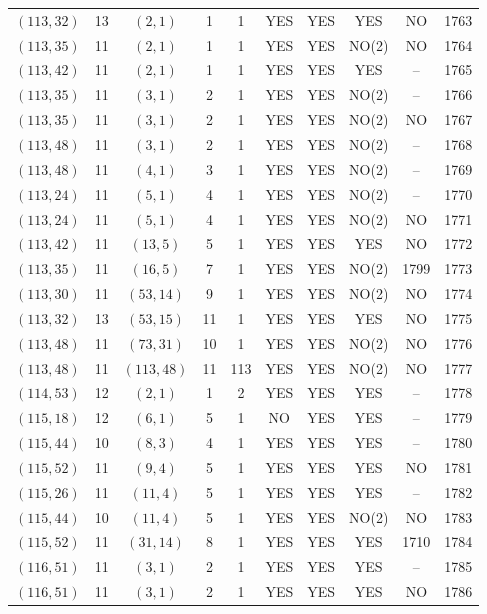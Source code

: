 \begin{longtable}{|c|c|c|c|c|c|c|c|c|c|}
$(113, 32)$ & 13 & $(2, 1)$ & 1 & 1 & YES & YES & YES & NO & 1763\\
$(113, 35)$ & 11 & $(2, 1)$ & 1 & 1 & YES & YES & NO(2) & NO & 1764\\
$(113, 42)$ & 11 & $(2, 1)$ & 1 & 1 & YES & YES & YES & -- & 1765\\
$(113, 35)$ & 11 & $(3, 1)$ & 2 & 1 & YES & YES & NO(2) & -- & 1766\\
$(113, 35)$ & 11 & $(3, 1)$ & 2 & 1 & YES & YES & NO(2) & NO & 1767\\
$(113, 48)$ & 11 & $(3, 1)$ & 2 & 1 & YES & YES & NO(2) & -- & 1768\\
$(113, 48)$ & 11 & $(4, 1)$ & 3 & 1 & YES & YES & NO(2) & -- & 1769\\
$(113, 24)$ & 11 & $(5, 1)$ & 4 & 1 & YES & YES & NO(2) & -- & 1770\\
$(113, 24)$ & 11 & $(5, 1)$ & 4 & 1 & YES & YES & NO(2) & NO & 1771\\
$(113, 42)$ & 11 & $(13, 5)$ & 5 & 1 & YES & YES & YES & NO & 1772\\
$(113, 35)$ & 11 & $(16, 5)$ & 7 & 1 & YES & YES & NO(2) & 1799 & 1773\\
$(113, 30)$ & 11 & $(53, 14)$ & 9 & 1 & YES & YES & NO(2) & NO & 1774\\
$(113, 32)$ & 13 & $(53, 15)$ & 11 & 1 & YES & YES & YES & NO & 1775\\
$(113, 48)$ & 11 & $(73, 31)$ & 10 & 1 & YES & YES & NO(2) & NO & 1776\\
$(113, 48)$ & 11 & $(113, 48)$ & 11 & 113 & YES & YES & NO(2) & NO & 1777\\
$(114, 53)$ & 12 & $(2, 1)$ & 1 & 2 & YES & YES & YES & -- & 1778\\
$(115, 18)$ & 12 & $(6, 1)$ & 5 & 1 & NO & YES & YES & -- & 1779\\
$(115, 44)$ & 10 & $(8, 3)$ & 4 & 1 & YES & YES & YES & -- & 1780\\
$(115, 52)$ & 11 & $(9, 4)$ & 5 & 1 & YES & YES & YES & NO & 1781\\
$(115, 26)$ & 11 & $(11, 4)$ & 5 & 1 & YES & YES & YES & -- & 1782\\
$(115, 44)$ & 10 & $(11, 4)$ & 5 & 1 & YES & YES & NO(2) & NO & 1783\\
$(115, 52)$ & 11 & $(31, 14)$ & 8 & 1 & YES & YES & YES & 1710 & 1784\\
$(116, 51)$ & 11 & $(3, 1)$ & 2 & 1 & YES & YES & YES & -- & 1785\\
$(116, 51)$ & 11 & $(3, 1)$ & 2 & 1 & YES & YES & YES & NO & 1786\\

\end{longtable}
